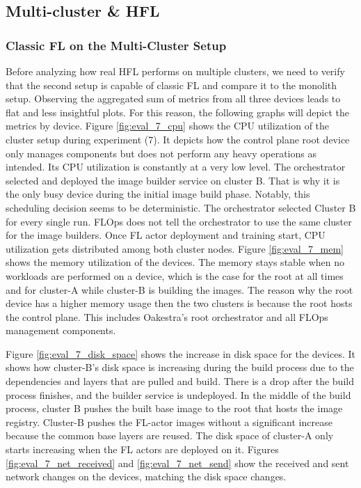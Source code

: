 
\subsection{Multi-cluster \& HFL}

\subsubsection{Classic FL on the Multi-Cluster Setup}

Before analyzing how real HFL performs on multiple clusters, we need to verify that the second setup is capable of classic FL and compare it to the monolith setup.
Observing the aggregated sum of metrics from all three devices leads to flat and less insightful plots.
For this reason, the following graphs will depict the metrics by device.
Figure \ref{fig:eval_7_cpu} shows the CPU utilization of the cluster setup during experiment (7).
It depicts how the control plane root device only manages components but does not perform any heavy operations as intended.
Its CPU utilization is constantly at a very low level.
The orchestrator selected and deployed the image builder service on cluster B.
That is why it is the only busy device during the initial image build phase.
Notably, this scheduling decision seems to be deterministic.
The orchestrator selected Cluster B for every single run.
FLOps does not tell the orchestrator to use the same cluster for the image builders.
Once FL actor deployment and training start, CPU utilization gets distributed among both cluster nodes.
Figure \ref{fig:eval_7_mem} shows the memory utilization of the devices.
The memory stays stable when no workloads are performed on a device, which is the case for the root at all times and for cluster-A while cluster-B is building the images. 
The reason why the root device has a higher memory usage then the two clusters is because the root hosts the control plane.
This includes Oakestra's root orchestrator and all FLOps management components.

Figure \ref{fig:eval_7_disk_space} shows the increase in disk space for the devices.
It shows how cluster-B's disk space is increasing during the build process due to the dependencies and layers that are pulled and build.
There is a drop after the build process finishes, and the builder service is undeployed.
In the middle of the build process, cluster B pushes the built base image to the root that hosts the image registry.
Cluster-B pushes the FL-actor images without a significant increase because the common base layers are reused.
The disk space of cluster-A only starts increasing when the FL actors are deployed on it.
Figures \ref{fig:eval_7_net_received} and \ref{fig:eval_7_net_send} show the received and sent network changes on the devices, matching the disk space changes.

